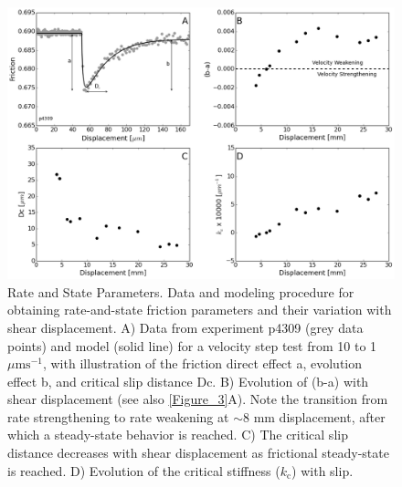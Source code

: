 \begin{figure}
	\centering
		\includegraphics[scale=0.4]{chap_lab_slow_eq/Figure_S2.png}
   	\caption{Rate and State Parameters. Data and modeling procedure for obtaining rate-and-state friction parameters and their variation with shear displacement. A) Data from experiment p4309 (grey data points) and model (solid line) for a velocity step test from 10 to 1 $\mu \text{ms}^{-1}$, with illustration of the friction direct effect a, evolution effect b, and critical slip distance Dc. B) Evolution of (b-a) with shear displacement (see also \ref{Figure_3}A). Note the transition from rate strengthening to rate weakening at $\sim$8 mm displacement, after which a steady-state behavior is reached. C) The critical slip distance decreases with shear displacement as frictional steady-state is reached. D) Evolution of the critical stiffness ($k_\text{c}$) with slip.}
  	\label{Figure_S2}
\end{figure}

